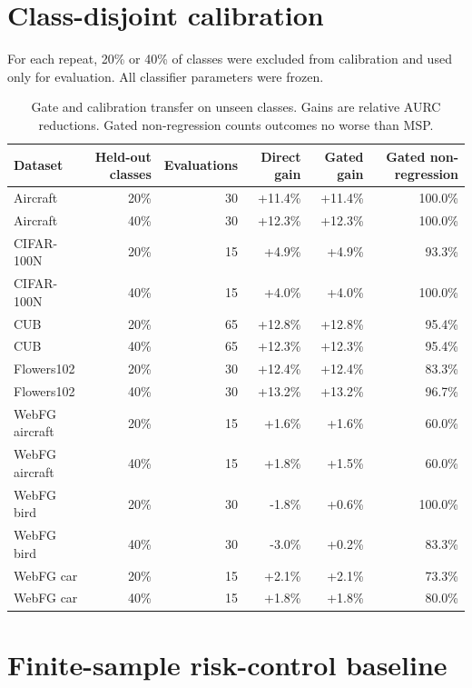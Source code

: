 \documentclass[11pt,a4paper]{article}
\begin{document}
\section{Class-disjoint calibration}

For each repeat, 20\% or 40\% of classes were excluded from calibration and used only for evaluation. All classifier parameters were frozen.

\begin{table}[H]
\centering
\caption{Gate and calibration transfer on unseen classes. Gains are relative AURC reductions. Gated non-regression counts outcomes no worse than MSP.}
\label{tab:class-disjoint}
\small
\setlength{\tabcolsep}{4pt}
\begin{tabular}{@{}lrrrrr@{}}
\toprule
Dataset & Held-out classes & Evaluations & Direct gain & Gated gain & Gated non-regression \\
\midrule
Aircraft & 20\% & 30 & +11.4\% & +11.4\% & 100.0\% \\
Aircraft & 40\% & 30 & +12.3\% & +12.3\% & 100.0\% \\
CIFAR-100N & 20\% & 15 & +4.9\% & +4.9\% & 93.3\% \\
CIFAR-100N & 40\% & 15 & +4.0\% & +4.0\% & 100.0\% \\
CUB & 20\% & 65 & +12.8\% & +12.8\% & 95.4\% \\
CUB & 40\% & 65 & +12.3\% & +12.3\% & 95.4\% \\
Flowers102 & 20\% & 30 & +12.4\% & +12.4\% & 83.3\% \\
Flowers102 & 40\% & 30 & +13.2\% & +13.2\% & 96.7\% \\
WebFG aircraft & 20\% & 15 & +1.6\% & +1.6\% & 60.0\% \\
WebFG aircraft & 40\% & 15 & +1.8\% & +1.5\% & 60.0\% \\
WebFG bird & 20\% & 30 & -1.8\% & +0.6\% & 100.0\% \\
WebFG bird & 40\% & 30 & -3.0\% & +0.2\% & 83.3\% \\
WebFG car & 20\% & 15 & +2.1\% & +2.1\% & 73.3\% \\
WebFG car & 40\% & 15 & +1.8\% & +1.8\% & 80.0\% \\
\bottomrule
\end{tabular}
\end{table}

\section{Finite-sample risk-control baseline}
\end{document}
